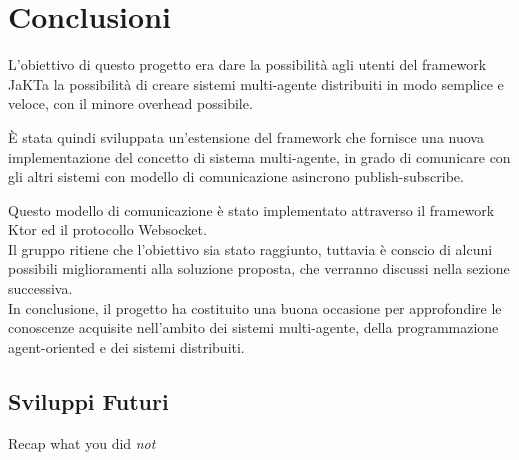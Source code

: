 \section{Conclusioni}
L'obiettivo di questo progetto era dare la possibilità agli utenti del framework JaKTa la possibilità di creare sistemi multi-agente distribuiti in modo semplice e veloce, 
con il minore overhead possibile.

È stata quindi sviluppata un'estensione del framework che fornisce una nuova implementazione del concetto di sistema multi-agente, in grado di comunicare con gli altri sistemi
con modello di comunicazione asincrono publish-subscribe.

Questo modello di comunicazione è stato implementato attraverso il framework Ktor ed il protocollo Websocket. \\

Il gruppo ritiene che l'obiettivo sia stato raggiunto, tuttavia è conscio di alcuni possibili miglioramenti alla soluzione proposta, che verranno discussi nella sezione successiva.\\

In conclusione, il progetto ha costituito una buona occasione per approfondire le conoscenze acquisite nell'ambito dei sistemi multi-agente, della programmazione agent-oriented e dei sistemi distribuiti.


\subsection{Sviluppi Futuri}

Recap what you did \emph{not}

